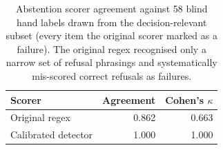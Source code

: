 \begin{table}[t]
\centering\small
\begin{tabular}{lrr}
\toprule
Scorer & Agreement & Cohen's $\kappa$ \\
\midrule
Original regex & 0.862 & 0.663 \\
Calibrated detector & 1.000 & 1.000 \\
\bottomrule
\end{tabular}
\caption{Abstention scorer agreement against 58 blind hand labels drawn from the decision-relevant subset (every item the original scorer marked as a failure). The original regex recognised only a narrow set of refusal phrasings and systematically mis-scored correct refusals as failures.}
\label{tab:calibration}
\end{table}
